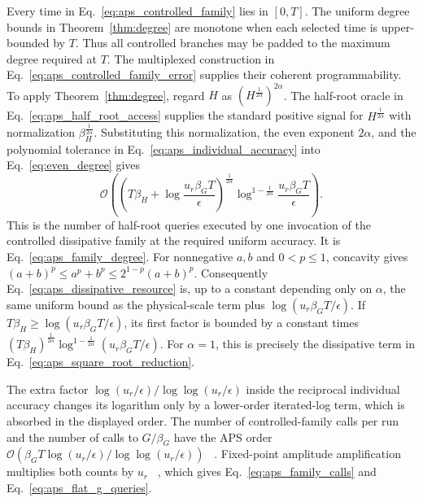 \documentclass[aps,pra,reprint,floatfix,unsortedaddress,superscriptaddress]{revtex4-2}
\newcommand{\Ocal}{\mathcal{O}}
\begin{document}
Every time in Eq.~\eqref{eq:aps_controlled_family} lies in $[0,T]$.
The uniform degree bounds in Theorem~\ref{thm:degree} are monotone when
each selected time is upper-bounded by $T$.  Thus all
controlled branches may be padded to the maximum degree required at
$T$.  The multiplexed construction in
Eq.~\eqref{eq:aps_controlled_family_error} supplies their coherent
programmability.
To apply Theorem~\ref{thm:degree}, regard $H$ as
$(H^{\frac{1}{2\alpha}})^{2\alpha}$.  The half-root oracle in
Eq.~\eqref{eq:aps_half_root_access} supplies the standard positive signal
for $H^{\frac{1}{2\alpha}}$ with normalization
$\beta_H^{\frac{1}{2\alpha}}$.  Substituting this normalization, the
even exponent $2\alpha$, and the polynomial tolerance in
Eq.~\eqref{eq:aps_individual_accuracy} into Eq.~\eqref{eq:even_degree}
gives
\begin{equation}
\Ocal\!\left(
\left(
T\beta_H+\log\frac{u_r\beta_G T}{\epsilon}
\right)^{\frac{1}{2\alpha}}
\log^{1-\frac{1}{2\alpha}}\!\frac{u_r\beta_G T}{\epsilon}
\right).
\label{eq:aps_dissipative_resource}
\end{equation}
This is the number of half-root queries executed by one invocation of
the controlled dissipative family at the required uniform accuracy.  It
is Eq.~\eqref{eq:aps_family_degree}.  For nonnegative $a,b$ and
$0<p\leq1$,
concavity gives
$(a+b)^p\leq a^p+b^p\leq2^{1-p}(a+b)^p$.
Consequently Eq.~\eqref{eq:aps_dissipative_resource} is, up to a
constant depending only on $\alpha$, the same uniform bound as the
physical-scale term plus $\log(u_r\beta_G T/\epsilon)$.  If
$T\beta_H\geq\log(u_r\beta_G T/\epsilon)$, its first factor is bounded
by a constant times
$(T\beta_H)^{\frac{1}{2\alpha}}
\log^{1-\frac{1}{2\alpha}}(u_r\beta_G T/\epsilon)$.
For $\alpha=1$, this is precisely the dissipative term in
Eq.~\eqref{eq:aps_square_root_reduction}.

The extra factor
$\log(u_r/\epsilon)/\log\log(u_r/\epsilon)$ inside the reciprocal
individual accuracy changes its logarithm only by a lower-order
iterated-log term, which is absorbed in the displayed order.  The
number of controlled-family calls per run and the number of calls to
$G/\beta_G$ have the APS order
$\Ocal(\beta_G T\log(u_r/\epsilon)/\log\log(u_r/\epsilon))$
~\cite{hu2026quantumsimulationnonunitarydynamics}.  Fixed-point
amplitude amplification multiplies both counts by $u_r$
~\cite{Yoder2014fixedpoint}, which gives
Eq.~\eqref{eq:aps_family_calls} and
Eq.~\eqref{eq:aps_flat_g_queries}.
\end{document}
